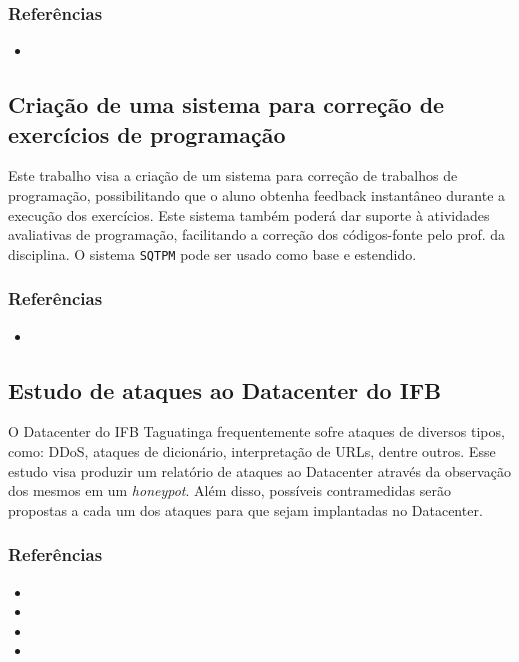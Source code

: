 \documentclass{article}
\newcommand*{\nsubsection}[1]{
    \subsection{#1}
}
\begin{document}
\subsubsection*{Referências}


\begin{itemize}
	\item {}
\end{itemize}


\nsubsection{Criação de uma sistema para correção de exercícios de programação}

Este trabalho visa a criação de um sistema para correção de trabalhos de programação, possibilitando que o aluno obtenha feedback instantâneo durante a execução dos exercícios. Este sistema também poderá dar suporte à atividades avaliativas de programação, facilitando a correção dos códigos-fonte pelo prof. da disciplina. O sistema {\tt SQTPM} pode ser usado como base e estendido.

\subsubsection*{Referências}


\begin{itemize}
	\item {}
\end{itemize}




\nsubsection{Estudo de ataques ao Datacenter do IFB}

O Datacenter do IFB Taguatinga frequentemente sofre ataques de diversos tipos, como: DDoS, ataques de dicionário, interpretação de URLs, dentre outros.
Esse estudo visa produzir um relatório de ataques ao Datacenter através da observação dos mesmos em um \textit{honeypot}. Além disso, possíveis contramedidas serão propostas a cada um dos ataques para que sejam implantadas no Datacenter.

\subsubsection*{Referências}

\begin{itemize}
	\item {}
	\item {}
	\item {}
	\item {}
\end{itemize}
\end{document}
